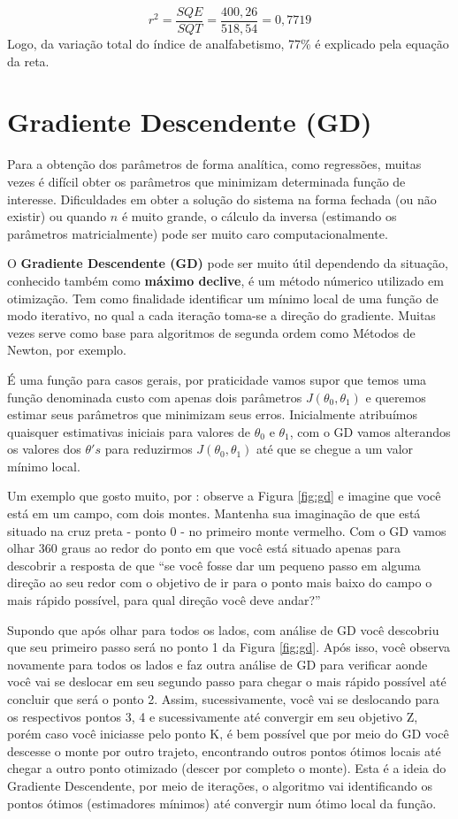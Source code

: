 \documentclass[
]{book}
\begin{document}
\[r^2=\frac{SQE}{SQT}=\frac{400,26}{518,54}=0,7719\]
Logo, da variação total do índice de analfabetismo, 77\% é explicado pela equação da reta.

\hypertarget{GD}{%
\section{Gradiente Descendente (GD)}\label{GD}}

Para a obtenção dos parâmetros de forma analítica, como regressões, muitas vezes é difícil obter os parâmetros que minimizam determinada função de interesse. Dificuldades em obter a solução do sistema na forma fechada (ou não existir) ou quando \(n\) é muito grande, o cálculo da inversa (estimando os parâmetros matricialmente) pode ser muito caro computacionalmente.

O \textbf{Gradiente Descendente (GD)} pode ser muito útil dependendo da situação, conhecido também como \textbf{máximo declive}, é um método númerico utilizado em otimização. Tem como finalidade identificar um mínimo local de uma função de modo iterativo, no qual a cada iteração toma-se a direção do gradiente. Muitas vezes serve como base para algoritmos de segunda ordem como Métodos de Newton, por exemplo.

É uma função para casos gerais, por praticidade vamos supor que temos uma função denominada custo com apenas dois parâmetros \(J(\theta_0,\theta_1)\) e queremos estimar seus parâmetros que minimizam seus erros. Inicialmente atribuímos quaisquer estimativas iniciais para valores de \(\theta_0\) e \(\theta_1\), com o GD vamos alterandos os valores dos \(\theta's\) para reduzirmos \(J(\theta_0,\theta_1)\) até que se chegue a um valor mínimo local.

Um exemplo que gosto muito, por \citet{andrewcoursera}: observe a Figura \ref{fig:gd} e imagine que você está em um campo, com dois montes. Mantenha sua imaginação de que está situado na cruz preta - ponto 0 - no primeiro monte vermelho. Com o GD vamos olhar 360 graus ao redor do ponto em que você está situado apenas para descobrir a resposta de que ``se você fosse dar um pequeno passo em alguma direção ao seu redor com o objetivo de ir para o ponto mais baixo do campo o mais rápido possível, para qual direção você deve andar?''

Supondo que após olhar para todos os lados, com análise de GD você descobriu que seu primeiro passo será no ponto 1 da Figura \ref{fig:gd}. Após isso, você observa novamente para todos os lados e faz outra análise de GD para verificar aonde você vai se deslocar em seu segundo passo para chegar o mais rápido possível até concluir que será o ponto 2. Assim, sucessivamente, você vai se deslocando para os respectivos pontos 3, 4 e sucessivamente até convergir em seu objetivo Z, porém caso você iniciasse pelo ponto K, é bem possível que por meio do GD você descesse o monte por outro trajeto, encontrando outros pontos ótimos locais até chegar a outro ponto otimizado (descer por completo o monte). Esta é a ideia do Gradiente Descendente, por meio de iterações, o algoritmo vai identificando os pontos ótimos (estimadores mínimos) até convergir num ótimo local da função.
\end{document}
